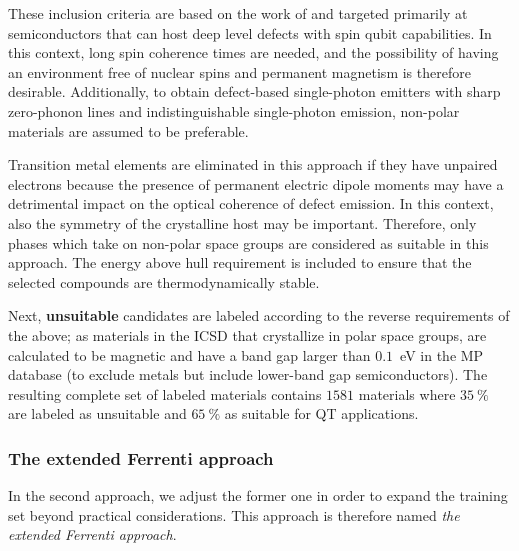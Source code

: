 \documentclass[superscriptaddress,unsortedaddress,
 amsmath,amssymb,
 aps,
]{revtex4-2}
\begin{document}
These inclusion criteria are based on the work of \citeauthor{Weber2010} \cite{Weber2010} and targeted primarily at semiconductors that can host deep level defects with spin qubit capabilities. In this context, long spin coherence times are needed, and the possibility of having an environment free of nuclear spins and permanent magnetism is therefore desirable. Additionally, to obtain defect-based single-photon emitters with sharp zero-phonon lines and indistinguishable single-photon emission, non-polar materials are assumed to be preferable. 

Transition metal elements are eliminated in this approach if they have unpaired electrons because the presence of permanent electric dipole moments may have a detrimental impact on the optical coherence of defect emission. In this context, also the symmetry of the crystalline host may be important. Therefore, only phases which take on non-polar space groups are considered as suitable in this approach. 
The energy above hull requirement is included to ensure that the selected compounds are thermodynamically stable. 

Next, \textbf{unsuitable} candidates are labeled according to the reverse requirements of the above; as materials in the ICSD \cite{Allen1987,Zagorac2019} 
that crystallize in polar space groups, are calculated to be magnetic and have a band gap larger than $0.1$~eV in the MP database (to exclude metals but include lower-band gap semiconductors). 
The resulting complete set of labeled materials contains $1581$ materials where $35 \ \%$
are labeled as unsuitable and 
$65 \ \%$ as suitable for QT applications.  


\subsubsection*{The extended Ferrenti approach}
In the second approach, we adjust the former one in order to expand the training set beyond practical considerations. This approach is therefore named \emph{the extended Ferrenti approach}. 
\end{document}

